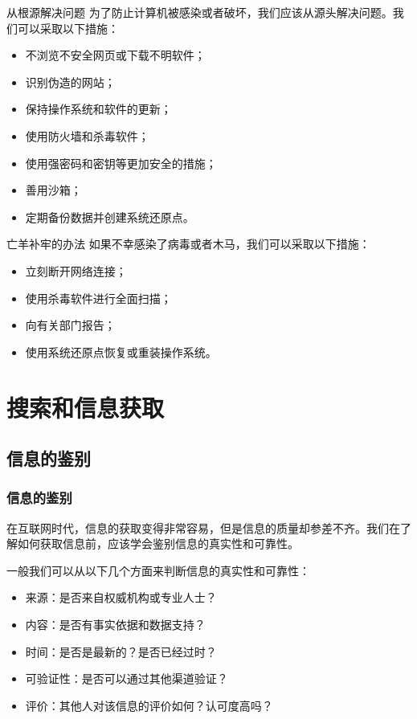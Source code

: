 \documentclass{beamer}
\begin{document}
\begin{frame}{从根源解决问题}
    为了防止计算机被感染或者破坏，我们应该从源头解决问题。我们可以采取以下措施：
    \begin{itemize}
        \item <2->不浏览不安全网页或下载不明软件；
        \item <3->识别伪造的网站；
        \item <4->保持操作系统和软件的更新；
        \item <5->使用防火墙和杀毒软件；
        \item <6->使用强密码和密钥等更加安全的措施；
        \item <7->善用沙箱；
        \item <8->定期备份数据并创建系统还原点。
    \end{itemize}
\end{frame}

\begin{frame}{亡羊补牢的办法}
    如果不幸感染了病毒或者木马，我们可以采取以下措施：
    \begin{itemize}
        \item <2->立刻断开网络连接；
        \item <3->使用杀毒软件进行全面扫描；
        \item <4->向有关部门报告；
        \item <5->使用系统还原点恢复或重装操作系统。
    \end{itemize}
\end{frame}

\section{搜索和信息获取}

\subsection{信息的鉴别}
\begin{frame}
    \frametitle{信息的鉴别}
    在互联网时代，信息的获取变得非常容易，但是信息的质量却参差不齐。我们在了解如何获取信息前，应该学会鉴别信息的真实性和可靠性。

    一般我们可以从以下几个方面来判断信息的真实性和可靠性：
    \begin{itemize}
        \item <2->来源：是否来自权威机构或专业人士？
        \item <3->内容：是否有事实依据和数据支持？
        \item <4->时间：是否是最新的？是否已经过时？
        \item <5->可验证性：是否可以通过其他渠道验证？
        \item <6->评价：其他人对该信息的评价如何？认可度高吗？
    \end{itemize}
\end{frame}
\end{document}
